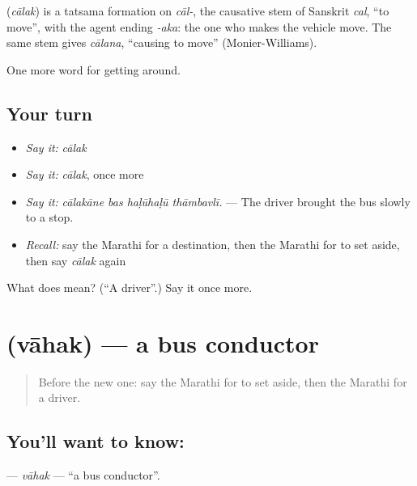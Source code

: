 \begin{cousinweb}
\textbf{} (\emph{cālak}) is a tatsama formation on \emph{cāl-}, the causative stem of Sanskrit \emph{cal}, \textquotedblleft{}to move\textquotedblright{}, with the agent ending \emph{-aka}: the one who makes the vehicle move. The same stem gives \emph{cālana}, \textquotedblleft{}causing to move\textquotedblright{} (Monier-Williams).
\end{cousinweb}

\begin{grammarlens}[title={What you've built}]
One more word for getting around.
\end{grammarlens}

\subsection*{Your turn}
\begin{itemize}
\raggedright
  \item \emph{Say it:} \emph{cālak}
  \item \emph{Say it:} \emph{cālak}, once more
  \item \emph{Say it:} \emph{cālakāne bas haḷūhaḷū thāmbavlī.} — The driver brought the bus slowly to a stop.
  \item \emph{Recall:} say the Marathi for a destination, then the Marathi for to set aside, then say \emph{cālak} again
\end{itemize}

\begin{tcolorbox}[breakable,colback=teal!4,colframe=teal!35!black,title={Before you move on}]
What does  mean? (\textquotedblleft{}A driver\textquotedblright{}.) Say it once more.
\end{tcolorbox}
\section[\texorpdfstring{\mr{वाहक} (vāhak)}{वाहक (vāhak)}]{ (vāhak) — a bus conductor}

\label{lesson:MR-C399-vahak}



\begin{quote}
Before the new one: say the Marathi for to set aside, then the Marathi for a driver.
\end{quote}

\subsection*{You'll want to know: }
\textbf{} — \emph{vāhak} — \textquotedblleft{}a bus conductor\textquotedblright{}.

